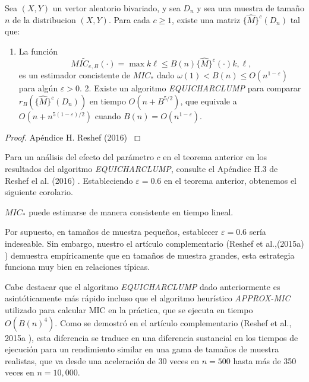 	\begin{thm}
		Sea $(X, Y)$  un vertor aleatorio bivariado, y sea $D_n$ y sea una muestra de tama\~no $n$ de la distribucion $(X, Y)$. Para cada $c \geq 1$, existe una matriz $\{\widehat{M}\}^c\left(D_n\right)$ tal que:
		\begin{enumerate}
			\item La funci\'on
			$$
			\widetilde{M I C_{e, B}}(\cdot)=\max {k \ell \leq B(n)}\{\widehat{M}\}^c(\cdot){k, \ell},
			$$
			es un estimador concistente de $M I C_*$ dado $\omega(1)<B(n) \leq O\left(n^{1-\varepsilon}\right)$ para alg\'un $\varepsilon>0$.
			2. Existe un algoritmo \textit{EQUICHARCLUMP} para comparar $r_B\left(\{\widehat{M}\}^c\left(D_n\right)\right)$ en tiempo $O\left(n+B^{5 / 2}\right)$, que equivale a $O\left(n+n^{5(1-\varepsilon) / 2}\right)$ cuando $B(n)=O\left(n^{1-\varepsilon}\right)$.
		\end{enumerate}
		\begin{proof}
			Ap\'endice H. Reshef (2016) \cite{Reshef2016}
		\end{proof}

		Para un an\'alisis del efecto del par\'ametro $c$ en el teorema anterior en los resultados del algoritmo \textit{EQUICHARCLUMP}, consulte el Ap\'endice H.3 de Reshef el al. (2016) \cite{Reshef2016}. Estableciendo $\varepsilon=0.6$ en el teorema anterior, obtenemos el siguiente corolario.

		\begin{cor}
			$ M I C_*$ puede estimarse de manera consistente en tiempo lineal. 
		\end{cor}

		Por supuesto, en tama\~nos de muestra peque\~nos, establecer $\varepsilon=0.6$ ser\'ia indeseable. Sin embargo, nuestro el art\'iculo complementario (Reshef et al.,(2015a) \cite{Reshef2015a}) demuestra emp\'iricamente que en tama\~nos de muestra grandes, esta estrategia funciona muy bien en relaciones t\'ipicas.

		Cabe destacar que el algoritmo \textit{EQUICHARCLUMP} dado anteriormente es asint\'oticamente m\'as r\'apido incluso que el algoritmo heur\'istico \textit{APPROX-MIC} utilizado para calcular MIC en la pr\'actica, que se ejecuta en tiempo $O\left(B(n)^4\right)$. Como se demostr\'o en el art\'iculo complementario (Reshef et al., 2015a \cite{Reshef2016}), esta diferencia se traduce en una diferencia sustancial en los tiempos de ejecuci\'on para un rendimiento similar en una gama de tama\~nos de muestra realistas, que va desde una aceleraci\'on de 30 veces en $n=500$ hasta m\'as de 350 veces en $n=10,000$.
	\end{thm}

